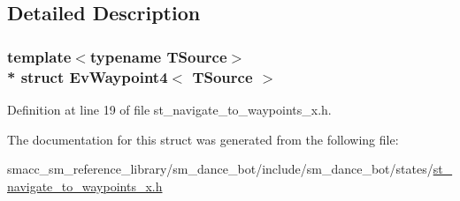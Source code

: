 \subsection{Detailed Description}
\subsubsection*{template$<$typename T\+Source$>$\\*
struct Ev\+Waypoint4$<$ T\+Source $>$}



Definition at line 19 of file st\+\_\+navigate\+\_\+to\+\_\+waypoints\+\_\+x.\+h.



The documentation for this struct was generated from the following file\+:\begin{DoxyCompactItemize}
\item 
smacc\+\_\+sm\+\_\+reference\+\_\+library/sm\+\_\+dance\+\_\+bot/include/sm\+\_\+dance\+\_\+bot/states/\hyperlink{st__navigate__to__waypoints__x_8h}{st\+\_\+navigate\+\_\+to\+\_\+waypoints\+\_\+x.\+h}\end{DoxyCompactItemize}
